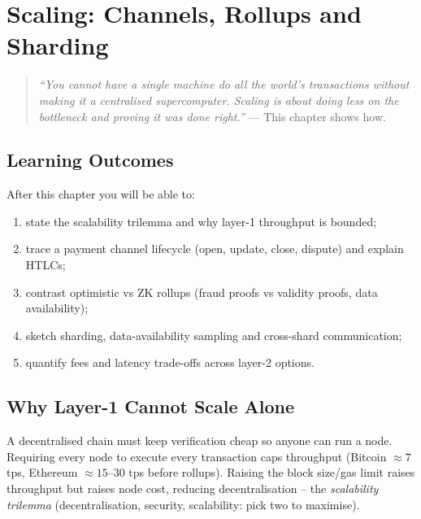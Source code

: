 \chapter{Scaling: Channels, Rollups and Sharding}\label{ch:scaling}

\begin{quote}
\emph{``You cannot have a single machine do all the world's transactions without making it a centralised supercomputer. Scaling is about doing less on the bottleneck and proving it was done right.''} --- This chapter shows how.
\end{quote}

\noindent{}
\vspace{0.4em}

\section*{Learning Outcomes}
After this chapter you will be able to:
\begin{enumerate}[label=(L\arabic*)]
    \item state the scalability trilemma and why layer-1 throughput is bounded;
    \item trace a payment channel lifecycle (open, update, close, dispute) and explain HTLCs;
    \item contrast optimistic vs ZK rollups (fraud proofs vs validity proofs, data availability);
    \item sketch sharding, data-availability sampling and cross-shard communication;
    \item quantify fees and latency trade-offs across layer-2 options.
\end{enumerate}

\section{Why Layer-1 Cannot Scale Alone}\label{sec:trilemma}
A decentralised chain must keep verification cheap so anyone can run a node. Requiring every node to execute every transaction caps throughput (Bitcoin $\approx7$ tps, Ethereum $\approx15$--$30$ tps before rollups). Raising the block size/gas limit raises throughput but raises node cost, reducing decentralisation -- the \emph{scalability trilemma} (decentralisation, security, scalability: pick two to maximise).

